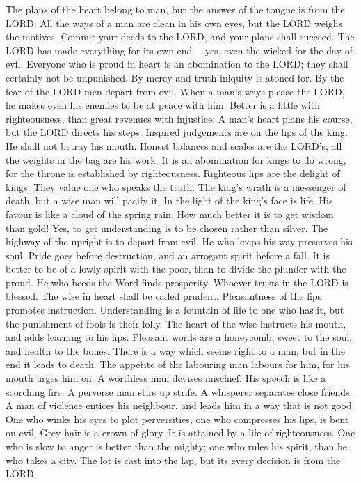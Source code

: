  The plans of the heart belong to man, but the answer of
the tongue is from the LORD.  All the ways of a man are
clean in his own eyes, but the LORD weighs the motives. 
Commit your deeds to the LORD, and your plans shall succeed.
 The LORD has made everything for its own end--- yes, even
the wicked for the day of evil.  Everyone who is proud in
heart is an abomination to the LORD; they shall certainly not be
unpunished.  By mercy and truth iniquity is atoned for. By
the fear of the LORD men depart from evil.  When a man's
ways please the LORD, he makes even his enemies to be at peace with him.
 Better is a little with righteousness, than great
revenues with injustice.  A man's heart plans his course,
but the LORD directs his steps.  Inspired judgements are
on the lips of the king. He shall not betray his mouth. 
Honest balances and scales are the LORD's; all the weights in the bag
are his work.  It is an abomination for kings to do
wrong, for the throne is established by righteousness. 
Righteous lips are the delight of kings. They value one who speaks the
truth.  The king's wrath is a messenger of death, but a
wise man will pacify it.  In the light of the king's face
is life. His favour is like a cloud of the spring rain. 
How much better it is to get wisdom than gold! Yes, to get understanding
is to be chosen rather than silver.  The highway of the
upright is to depart from evil. He who keeps his way preserves his soul.
 Pride goes before destruction, and an arrogant spirit
before a fall.  It is better to be of a lowly spirit with
the poor, than to divide the plunder with the proud.  He
who heeds the Word finds prosperity. Whoever trusts in the LORD is
blessed.  The wise in heart shall be called prudent.
Pleasantness of the lips promotes instruction. 
Understanding is a fountain of life to one who has it, but the
punishment of fools is their folly.  The heart of the
wise instructs his mouth, and adds learning to his lips. 
Pleasant words are a honeycomb, sweet to the soul, and health to the
bones.  There is a way which seems right to a man, but in
the end it leads to death.  The appetite of the labouring
man labours for him, for his mouth urges him on.  A
worthless man devises mischief. His speech is like a scorching fire.
 A perverse man stirs up strife. A whisperer separates
close friends.  A man of violence entices his neighbour,
and leads him in a way that is not good.  One who winks
his eyes to plot perversities, one who compresses his lips, is bent on
evil.  Grey hair is a crown of glory. It is attained by a
life of righteousness.  One who is slow to anger is
better than the mighty; one who rules his spirit, than he who takes a
city.  The lot is cast into the lap, but its every
decision is from the LORD.

